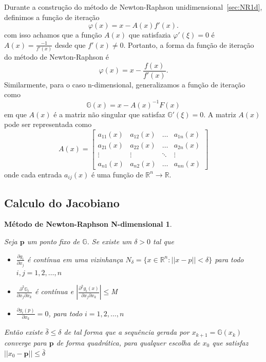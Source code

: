 Durante a construção do método de Newton-Raphson unidimensional~\ref{sec:NR1d}, definimos a função de iteração 
\begin{equation*}
\varphi(x) = x - {A(x)}{f'(x)}.
\end{equation*}
com isso achamos que a função \(A(x)\) que satisfazia \(\varphi'(\xi) = 0\) é \(A(x) = \frac{-1}{f'(x)}\) desde que \(f'(x) \neq 0\). Portanto, a forma da função de iteração do método de Newton-Raphson é
\begin{equation*}
    \varphi(x) = x - \frac{f(x)}{f'(x)}. 
\end{equation*}
Similarmente, para o caso n-dimensional, generalizamos a função de iteração como
\begin{equation*}
    \mathbb{G}(x) = x - A(x)^{-1} F(x)
\end{equation*}
em que \(A(x)\) é a matriz não singular que satisfaz \(\mathbb{G}'(\xi) = 0\). A matriz \(A(x)\) pode ser representada como
\begin{equation}\label{matA}
    A(x) =  
    \begin{bmatrix}
        a_{11}(x) & a_{12}(x) & \ldots & a_{1n}(x) \\
        a_{21}(x) & a_{22}(x) & \ldots & a_{2n}(x) \\
        \vdots & \vdots & \ddots & \vdots \\
        a_{n1}(x) & a_{n2}(x) & \ldots & a_{nn}(x)
    \end{bmatrix}
\end{equation}
onde cada entrada  \(a_{ij}(x)\) é uma função de   \(\mathbb{R}^n \rightarrow  \mathbb{R}\).

\subsection{Calculo do Jacobiano}

\newtheorem*{dfNRnd}{Método de Newton-Raphson N-dimensional}
\begin{dfNRnd}
    \begin{prop}
    Seja $\mathbf{p}$ um ponto fixo de \(\mathbb{G}\). Se existe um \(\delta > 0\) tal que

    \begin{itemize}\label{teoMPF}
        \item[i)] $\frac{\partial g_i}{\partial x_j}$ é contínua em uma vizinhança $N_{\delta} = \{x \in \mathbb{R}^n : ||x - p|| < \delta\}$ para todo $i, j = 1, 2, \ldots, n$
        \item [ii)] $\frac{\partial^2 \mathbb{G}_i}{\partial x_j \partial x_k}$ é contínua e $|\frac{\partial^2g_i(x)}{\partial x_j \partial x_k}| \leq $M$ $
        \item [iii)] $\frac{\partial g_i(p)}{\partial x_k} = 0$, para todo $i = 1,2, \ldots, n$
    \end{itemize}
    Então existe \(\bar{\delta} \leq \delta\) de tal forma que a sequência gerada por $x_{k+1} = \mathbb{G}(x_{k})$ converge para $\mathbf{p}$ de forma quadrática, para qualquer escolha de $x_{0}$ que satisfaz \(|| x_{0} - \mathbf{p} || \leq \bar{\delta}\)
    \end{prop}

\end{dfNRnd}

